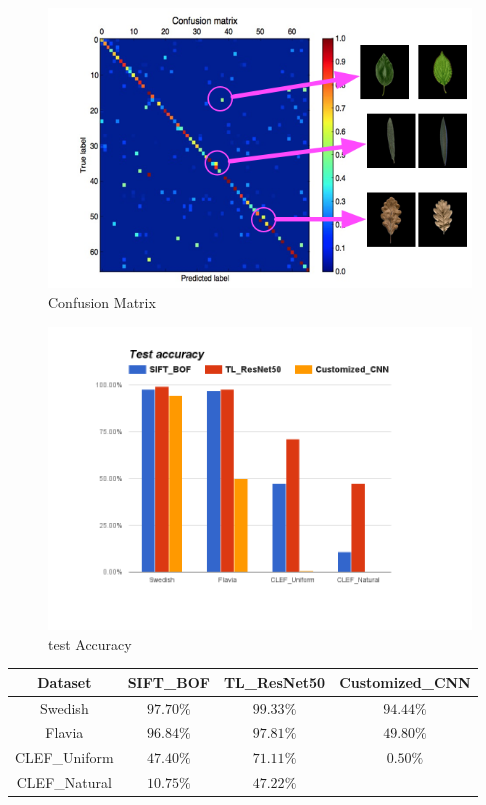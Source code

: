 \documentclass[journal, 10pt]{IEEEtran}
\begin{document}
\begin{figure}[H]
  \centering
  \includegraphics[width=1.00\linewidth]{best_cm_uniform}
  \caption{ Confusion Matrix }
  \label{fig:best_cm_uniform}
\end{figure}

\begin{figure}[H]
  \centering
  \includegraphics[width=1.00\linewidth]{test_accuracy_with_customized_cnn}
  \caption{ test Accuracy }
  \label{fig:test_accuracy}
\end{figure}

\begin{tabular}{c@{}c@{}c@{}c@{}}
Dataset       & SIFT\_BOF & TL\_ResNet50  & Customized\_CNN \\
\hline
Swedish       & $97.70\%$ & $99.33\%$     & $94.44\%$ \\
Flavia        & $96.84\%$ & $97.81\%$     & $49.80\%$ \\
CLEF\_Uniform & $47.40\%$ & $71.11\%$     & $0.50\%$  \\
CLEF\_Natural & $10.75\%$ & $47.22\%$     &
\end{tabular}
\end{document}
